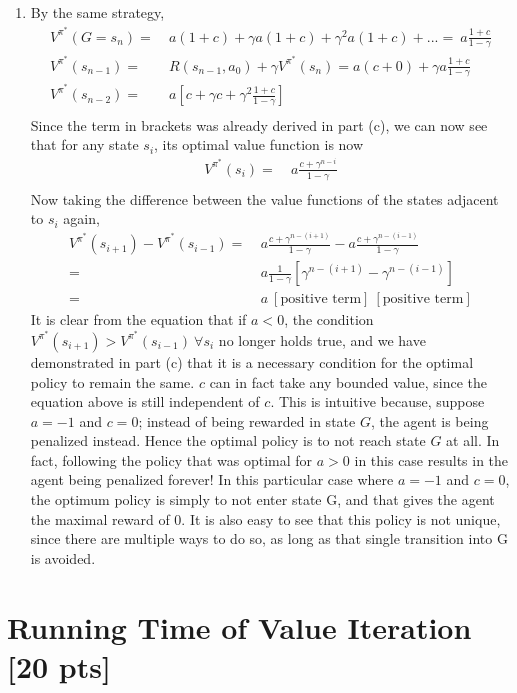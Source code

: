 \documentclass[11pt]{article}
\newcommand{\Vfunc}[2]{\ensuremath{V^{#1}(#2)}}
\begin{document}
\begin{enumerate}[label=(\alph*)]
	\item 
	By the same strategy,
	\begin{align*}
	\Vfunc{\pi^*}{G=s_n}
	=&\ a(1+c)+\gamma a(1+c)+\gamma^2 a(1+c)+... =\ a\frac{1+c}{1-\gamma} \\ 
	\Vfunc{\pi^*}{s_{n-1}}
	=&\ R(s_{n-1}, a_0) + \gamma V^{\pi^*}(s_n) = a(c+0) + \gamma a\frac{1+c}{1-\gamma} \\ 
	\Vfunc{\pi^*}{s_{n-2}}
	=&\ a\left[c + \gamma c + \gamma^2 \frac{1+c}{1-\gamma}\right] \\
	\end{align*}
	Since the term in brackets was already derived in part (c), we can now see that for any state $s_i$, its optimal value function is now
	\begin{align*}
	\Vfunc{\pi^*}{s_i} =&\ a\frac{c+\gamma^{n-i}}{1-\gamma} \\ 
	\end{align*}
	Now taking the difference between the value functions of the states adjacent to $s_i$ again,
	\begin{align*}
	\Vfunc{\pi^*}{s_{i+1}} - \Vfunc{\pi^*}{s_{i-1}} =&\ a\frac{c+\gamma^{n-(i+1)}}{1-\gamma} - a\frac{c+\gamma^{n-(i-1)}}{1-\gamma} \\
	=&\ a \frac{1}{1-\gamma}[\gamma^{n-(i+1)}-\gamma^{n-(i-1)}] \\
	=&\ a \ [\textrm{positive term}] \ [\textrm{positive term}]
	\end{align*}
	It is clear from the equation that if $a < 0$, the condition $\Vfunc{\pi^*}{s_{i+1}} > \Vfunc{\pi^*}{s_{i-1}} \ \forall s_i$ no longer holds true, and we have demonstrated in part (c) that it is a necessary condition for the optimal policy to remain the same. $c$ can in fact take any bounded value, since the equation above is still independent of $c$. This is intuitive because, suppose $a=-1$ and $c=0$; instead of being rewarded in state $G$, the agent is being penalized instead. Hence the optimal policy is to not reach state $G$ at all. In fact, following the policy that was optimal for $a>0$ in this case results in the agent being penalized forever! In this particular case where $a=-1$ and $c=0$, the optimum policy is simply to not enter state G, and that gives the agent the maximal reward of 0. It is also easy to see that this policy is not unique, since there are multiple ways to do so, as long as that single transition into G is avoided.
	
\end{enumerate}

\section{Running Time of Value Iteration [20 pts]}
\end{document}
